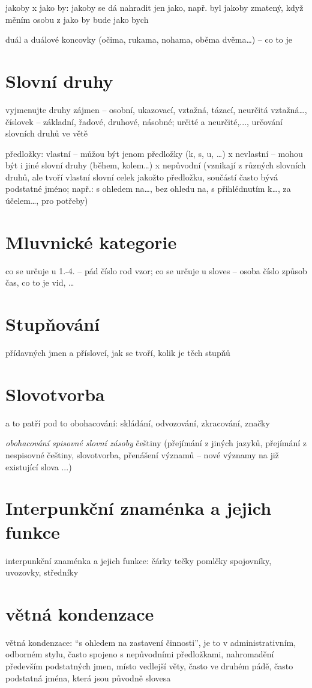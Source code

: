 \documentclass{memoir}
\begin{document}
jakoby x jako by: jakoby se dá nahradit jen jako, např. byl jakoby zmatený, když měním osobu z jako by bude jako bych

duál a duálové koncovky (očima, rukama, nohama, oběma dvěma…) – co to je


\section*{Slovní druhy}
vyjmenujte druhy zájmen – osobní, ukazovací, vztažná, tázací, neurčitá vztažná…, číslovek –  základní, řadové, druhové, násobné; určité a neurčité,..., určování slovních druhů ve větě

předložky: vlastní – můžou být jenom předložky (k, s, u, …) x nevlastní – mohou být i jiné slovní druhy (během, kolem…) x nepůvodní (vznikají z různých slovních druhů, ale tvoří vlastní slovní celek jakožto předložku, součástí často bývá podstatné jméno; např.: s ohledem na…, bez ohledu na, s přihlédnutím k…, za účelem…, pro potřeby)


\section*{Mluvnické kategorie}
co se určuje u 1.-4. – pád číslo rod vzor; co se určuje u sloves – osoba číslo způsob čas, co to je vid, …


\section*{Stupňování}
přídavných jmen a příslovcí, jak se tvoří, kolik je těch stupňů

\section*{Slovotvorba}
a to patří pod to obohacování: skládání, odvozování, zkracování, značky

\textit{obohacování spisovné slovní zásoby} češtiny (přejímání z jiných jazyků, přejímání z nespisovné češtiny, slovotvorba, přenášení významů – nové významy na již existující slova ...)

\section*{Interpunkční znaménka a jejich funkce}
interpunkční znaménka a jejich funkce: čárky tečky pomlčky spojovníky, uvozovky, středníky

\section*{větná kondenzace}
větná kondenzace: “s ohledem na zastavení činnosti”, je to v administrativním, odborném stylu, často spojeno s nepůvodními předložkami, nahromadění především podstatných jmen, místo vedlejší věty, často ve druhém pádě, často podstatná jména, která jsou původně slovesa
\end{document}
